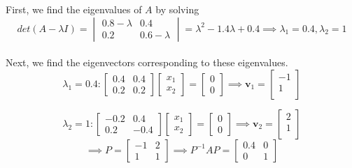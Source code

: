 \documentclass[letterpaper,12pt]{article}
\let\vec\mathbf
\theoremstyle{definition}
\begin{document}
First, we find the eigenvalues of $A$ by solving
\[ det(A - \lambda I) =
\begin{vmatrix}
  0.8 - \lambda & 0.4 \\
  0.2 & 0.6 - \lambda
\end{vmatrix}
= \lambda ^2 - 1.4 \lambda + 0.4
\implies \lambda_1 = 0.4, \lambda_2 = 1
\] \\
Next, we find the eigenvectors corresponding to these eigenvalues.
\[ \lambda_1 = 0.4:
\begin{bmatrix}
  0.4 & 0.4 \\
  0.2 & 0.2
\end{bmatrix}
\begin{bmatrix}
  x_1 \\ x_2
\end{bmatrix}
=
\begin{bmatrix}
  0 \\ 0
\end{bmatrix}
\implies \vec{v}_1 =
\begin{bmatrix}
  -1 \\
  1 \\
\end{bmatrix}
\]

\[ \lambda_2 = 1:
\begin{bmatrix}
  -0.2 & 0.4 \\
  0.2 & -0.4
\end{bmatrix}
\begin{bmatrix}
  x_1 \\ x_2
\end{bmatrix}
=
\begin{bmatrix}
  0 \\ 0
\end{bmatrix}
\implies \vec{v}_2 =
\begin{bmatrix}
  2 \\
  1 \\
\end{bmatrix}
\]
\[
\implies P =
\begin{bmatrix}
  -1 & 2 \\
  1 & 1
\end{bmatrix}
\implies P^{-1} A P =
\begin{bmatrix}
  0.4 & 0 \\
  0 & 1
\end{bmatrix}
\]
\end{document}
